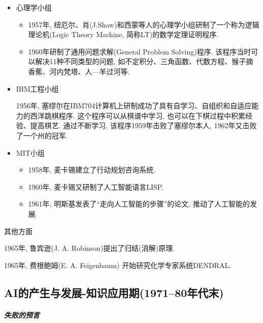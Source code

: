 \begin{itemize}
\item  心理学小组
    \begin{itemize}
        \item  1957年, 纽厄尔、肖(J.Shaw)和西蒙等人的心理学小组研制了一个称为逻辑理论机(Logic Theory Machine, 简称LT)的数学定理证明程序.
        \item  1960年研制了通用问题求解(General Problem Solving)程序. 该程序当时可以解决11种不同类型的问题, 如不定积分、三角函数、代数方程、猴子摘香蕉、河内梵塔、人—羊过河等.
    \end{itemize}
\item  IBM工程小组

     1956年, 塞缪尔在IBM704计算机上研制成功了具有自学习、自组织和自适应能力的西洋跳棋程序. 这个程序可以从棋谱中学习, 也可以在下棋过程中积累经验、提高棋艺. 通过不断学习, 该程序1959年击败了塞缪尔本人, 1962年又击败了一个州的冠军.
\item  MIT小组
    \begin{itemize}
       \item  1958年, 麦卡锡建立了行动规划咨询系统.
       \item  1960年, 麦卡锡又研制了人工智能语言LISP.
       \item  1961年, 明斯基发表了“走向人工智能的步骤”的论文, 推动了人工智能的发展.
    \end{itemize}
\end{itemize}

其他方面

      1965年, 鲁宾逊(J. A. Robinson)提出了归结(消解)原理.

      1965年, 费根鲍姆(E. A. Feigenbaum) 开始研究化学专家系统DENDRAL.
\subsection{AI的产生与发展-知识应用期(1971--80年代末)}
\subparagraph{失败的预言}

